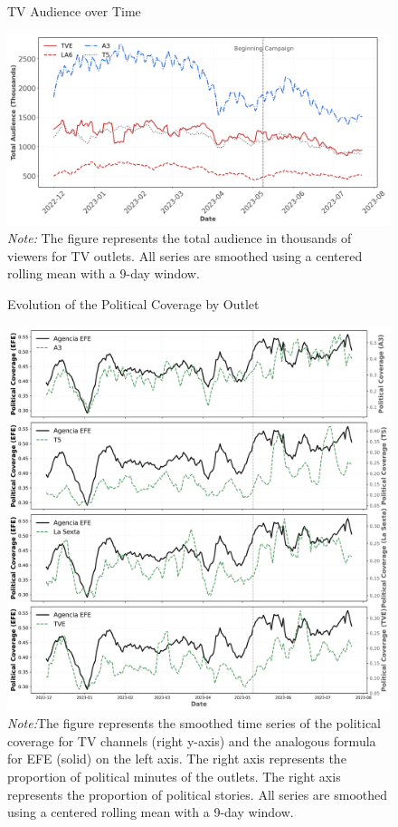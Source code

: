 \documentclass[12pt]{article}
\begin{document}
\begin{figure}[!htb]
	\caption{TV Audience over Time}
	\centering
	\includegraphics[width=150mm]{figures/tv_audience_total}
	\caption*{\small \textit{Note:} The figure represents the total audience in thousands of viewers for TV outlets. All series are smoothed using a centered rolling mean with a 9-day window.}
	\label{fig:audience_total}
\end{figure}





\begin{figure}[!htb]
	\caption{Evolution of the Political Coverage by Outlet}
	\centering
	\includegraphics[width=150mm]{figures/tv_vs_efe_political_by_channel}
	\caption*{\small \textit{Note:}The figure represents the smoothed time series of the political coverage for TV channels (right y-axis) and the analogous formula for  EFE (solid) on the left axis. The right axis represents the proportion of political minutes of the outlets. The right axis represents the proportion of political stories.   All series are smoothed using a centered rolling mean with a 9-day window.}
	\label{fig:political_by_channel}
\end{figure}
\end{document}
